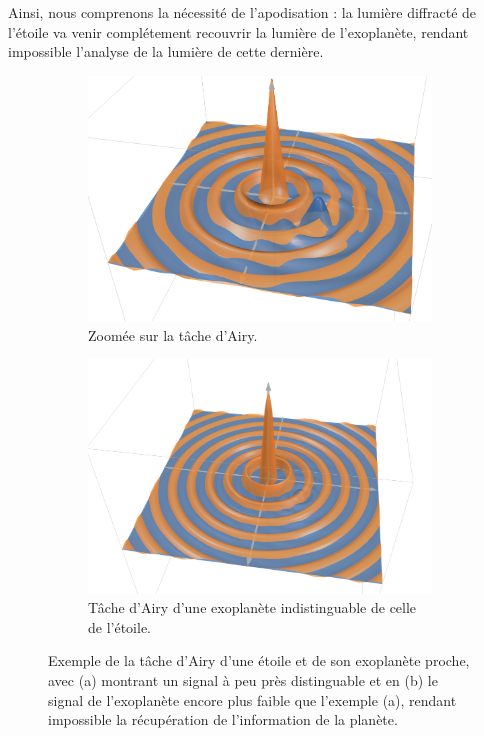 Ainsi, nous comprenons la nécessité de l'apodisation : la lumière diffracté de l'étoile va venir complétement recouvrir la lumière de l'exoplanète, rendant impossible l'analyse de la lumière de cette dernière. 


\begin{figure}[htbp]
    \centering
    \begin{subfigure}[b]{0.45\textwidth}
        \centering
        \includegraphics[width=\textwidth]{figures/st_pl_sgn.png}
        \caption{Zoomée sur la tâche d'Airy.}
    \end{subfigure}
    \hfill
    \begin{subfigure}[b]{0.45\textwidth}
        \centering
        \includegraphics[width=\textwidth]{figures/larg_st_pl_sgn.png}
        \caption{Tâche d'Airy d'une exoplanète indistinguable de celle de l'étoile.}
    \end{subfigure}
    \caption{Exemple de la tâche d'Airy d'une étoile et de son exoplanète proche, avec (a) montrant un signal à peu près distinguable et en (b) le signal de l'exoplanète encore plus faible que l'exemple (a), rendant impossible la récupération de l'information de la planète.}
\end{figure}


